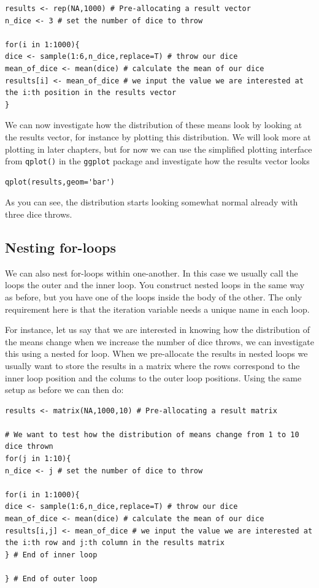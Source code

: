 \documentclass[
]{book}
\begin{document}
\begin{verbatim}
results <- rep(NA,1000) # Pre-allocating a result vector
n_dice <- 3 # set the number of dice to throw

for(i in 1:1000){
dice <- sample(1:6,n_dice,replace=T) # throw our dice
mean_of_dice <- mean(dice) # calculate the mean of our dice
results[i] <- mean_of_dice # we input the value we are interested at the i:th position in the results vector
}
\end{verbatim}

We can now investigate how the distribution of these means look by looking at the results vector, for instance by plotting this distribution. We will look more at plotting in later chapters, but for now we can use the simplified plotting interface from \texttt{qplot()} in the \texttt{ggplot} package and investigate how the results vector looks

\begin{verbatim}
qplot(results,geom='bar')
\end{verbatim}

As you can see, the distribution starts looking somewhat normal already with three dice throws.

\hypertarget{nesting-for-loops}{%
\subsection{Nesting for-loops}\label{nesting-for-loops}}

We can also nest for-loops within one-another. In this case we usually call the loops the outer and the inner loop. You construct nested loops in the same way as before, but you have one of the loops inside the body of the other. The only requirement here is that the iteration variable needs a unique name in each loop.

For instance, let us say that we are interested in knowing how the distribution of the means change when we increase the number of dice throws, we can investigate this using a nested for loop. When we pre-allocate the results in nested loops we usually want to store the results in a matrix where the rows correspond to the inner loop position and the colums to the outer loop positions. Using the same setup as before we can then do:

\begin{verbatim}
results <- matrix(NA,1000,10) # Pre-allocating a result matrix

# We want to test how the distribution of means change from 1 to 10 dice thrown
for(j in 1:10){
n_dice <- j # set the number of dice to throw

for(i in 1:1000){
dice <- sample(1:6,n_dice,replace=T) # throw our dice
mean_of_dice <- mean(dice) # calculate the mean of our dice
results[i,j] <- mean_of_dice # we input the value we are interested at the i:th row and j:th column in the results matrix
} # End of inner loop

} # End of outer loop
\end{verbatim}
\end{document}
